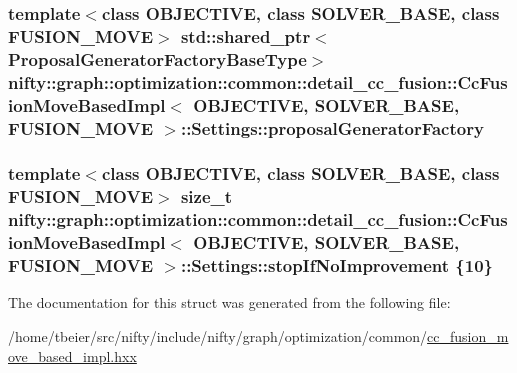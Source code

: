 \subsubsection[{proposal\+Generator\+Factory}]{\setlength{\rightskip}{0pt plus 5cm}template$<$class O\+B\+J\+E\+C\+T\+I\+V\+E, class S\+O\+L\+V\+E\+R\+\_\+\+B\+A\+S\+E, class F\+U\+S\+I\+O\+N\+\_\+\+M\+O\+V\+E$>$ std\+::shared\+\_\+ptr$<${\bf Proposal\+Generator\+Factory\+Base\+Type}$>$ {\bf nifty\+::graph\+::optimization\+::common\+::detail\+\_\+cc\+\_\+fusion\+::\+Cc\+Fusion\+Move\+Based\+Impl}$<$ O\+B\+J\+E\+C\+T\+I\+V\+E, S\+O\+L\+V\+E\+R\+\_\+\+B\+A\+S\+E, F\+U\+S\+I\+O\+N\+\_\+\+M\+O\+V\+E $>$\+::Settings\+::proposal\+Generator\+Factory}\label{structnifty_1_1graph_1_1optimization_1_1common_1_1detail__cc__fusion_1_1CcFusionMoveBasedImpl_1_1Settings_a435be867da9b6e152ea20fd511237edc}
\hypertarget{structnifty_1_1graph_1_1optimization_1_1common_1_1detail__cc__fusion_1_1CcFusionMoveBasedImpl_1_1Settings_a62fc2587e4db8be098135949208a22a8}{}
\subsubsection[{stop\+If\+No\+Improvement}]{\setlength{\rightskip}{0pt plus 5cm}template$<$class O\+B\+J\+E\+C\+T\+I\+V\+E, class S\+O\+L\+V\+E\+R\+\_\+\+B\+A\+S\+E, class F\+U\+S\+I\+O\+N\+\_\+\+M\+O\+V\+E$>$ size\+\_\+t {\bf nifty\+::graph\+::optimization\+::common\+::detail\+\_\+cc\+\_\+fusion\+::\+Cc\+Fusion\+Move\+Based\+Impl}$<$ O\+B\+J\+E\+C\+T\+I\+V\+E, S\+O\+L\+V\+E\+R\+\_\+\+B\+A\+S\+E, F\+U\+S\+I\+O\+N\+\_\+\+M\+O\+V\+E $>$\+::Settings\+::stop\+If\+No\+Improvement \{10\}}\label{structnifty_1_1graph_1_1optimization_1_1common_1_1detail__cc__fusion_1_1CcFusionMoveBasedImpl_1_1Settings_a62fc2587e4db8be098135949208a22a8}


The documentation for this struct was generated from the following file\+:\begin{DoxyCompactItemize}
\item 
/home/tbeier/src/nifty/include/nifty/graph/optimization/common/\hyperlink{cc__fusion__move__based__impl_8hxx}{cc\+\_\+fusion\+\_\+move\+\_\+based\+\_\+impl.\+hxx}\end{DoxyCompactItemize}
